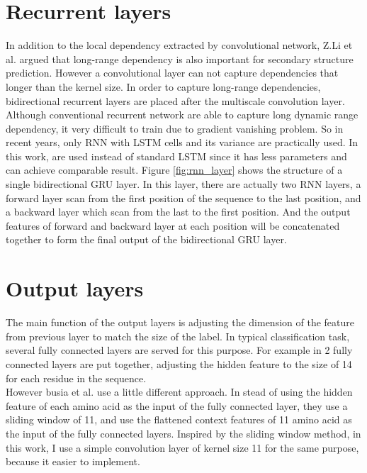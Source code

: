\section{Recurrent layers}
In addition to the local dependency extracted by convolutional network, Z.Li et al. \cite{Z.Li2016} argued that long-range dependency is also important for secondary structure prediction. However a convolutional layer can not capture dependencies that longer than the kernel size. In order to capture long-range dependencies, bidirectional recurrent layers are placed after the multiscale convolution layer. Although conventional recurrent network are able to capture long dynamic range dependency, it very difficult to train due to gradient vanishing problem. So in recent years, only RNN with LSTM cells and its variance are practically used. In this work, are used instead of standard LSTM since it has less parameters and can achieve comparable result\cite{zaremba2015empirical}. Figure \ref{fig:rnn_layer} shows the structure of a single bidirectional GRU layer. In this layer, there are actually two RNN layers, a forward layer scan from the first position of the sequence to the last position, and a backward layer which scan from the last to the first position. And the output features of forward and backward layer at each position will be concatenated together to form the final output of the bidirectional GRU layer.\par



\section{Output layers}
The main function of the output layers is adjusting the dimension of the feature from previous layer to match the size of the label. In typical classification task, several fully connected layers are served for this purpose. For example in \cite{Z.Li2016} 2 fully connected layers are put together, adjusting the hidden feature to the size of 14 for each residue in the sequence. \\
However busia et al. \cite{busia2016protein} use a little different approach. In stead of using the hidden feature of each amino acid as the input of the fully connected layer, they use a sliding window of 11, and use the flattened context features of 11 amino acid as the input of the fully connected layers. Inspired by the sliding window method, in this work, I use a simple convolution layer of kernel size 11 for the same purpose, because it easier to implement.\par

